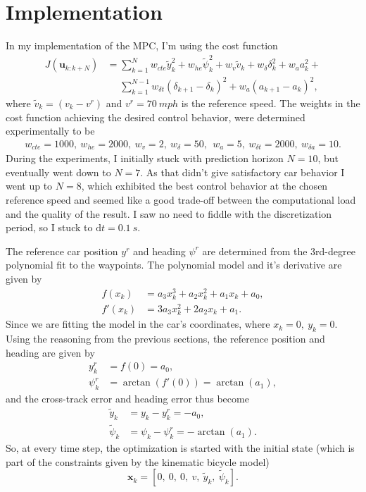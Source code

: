 \documentclass[a4paper]{article}
\begin{document}
\section{Implementation}
In my implementation of the MPC, I'm using the cost function 
\begin{align}\label{eq:mpc_my_cost}
	J(\bm{u}_{k:k+N}) 
	&= \sum_{k=1}^{N} w_{cte}\tilde{y}_k^2 + w_{he}\tilde{\psi}_k^2 + w_{v}\tilde{v}_k + w_{\delta}\delta_k^2  + w_{a}a_k^2 + \nonumber \\
	&\mathrel{\phantom{=}} \sum_{k=1}^{N-1} w_{\delta t}(\delta_{k+1} - \delta_k)^2 + w_a(a_{k+1} - a_k)^2,
\end{align}
where $ \tilde{v}_k = (v_k - v^r) $ and $ v^r = \SI{70}{mph} $ is the reference speed.
The weights in the cost function achieving the desired control behavior, were determined experimentally to be
\begin{align}\label{key}
w_{cte} = 1000,\ w_{he} = 2000,\  w_{v} = 2,\ w_{\delta} = 50,\ \ w_{a} = 5,\ w_{\delta t} = 2000,\ w_{\delta a} = 10.
\end{align}
During the experiments, I initially stuck with prediction horizon $ N = 10 $, but eventually went down to $ N = 7 $.
As that didn't give satisfactory car behavior I went up to $ N = 8 $, which exhibited the best control behavior at the chosen reference speed and seemed like a good trade-off between the computational load and the quality of the result.
I saw no need to fiddle with the discretization period, so I stuck to $ \mathrm{d}t = \SI{0.1}{s} $.

The reference car position $ y^r $ and heading $ \psi^r $ are determined from the 3rd-degree polynomial fit to the waypoints.
The polynomial model and it's derivative are given by
\begin{align}\label{eq:trajectory_polynomial}
	f(x_k) 	&= a_3x_k^3 + a_2x_k^2 + a_1x_k + a_0, \\
	f'(x_k) &= 3a_3x_k^2 + 2a_2x_k + a_1.
\end{align}
Since we are fitting the model in the car's coordinates, where $ x_k = 0,\ y_k = 0 $.
Using the reasoning from the previous sections, the reference position and heading are given by
\begin{align}\label{}
y^r_k 		&= f(0) = a_0, \\
\psi^r_k	&= \arctan(f'(0)) = \arctan(a_1),
\end{align}
and the cross-track error and heading error thus become
\begin{align}\label{}
	\tilde{y}_k 	&= y_k - y^r_k = -a_0,	\\
	\tilde{\psi}_k 	&= \psi_k - \psi^r_k = -\arctan(a_1).
\end{align}
So, at every time step, the optimization is started with the initial state (which is part of the constraints given by the kinematic bicycle model)
\begin{equation}\label{}
	\bm{x}_k = \left[ 0,\ 0,\ 0,\ v,\ \tilde{y}_k,\ \tilde{\psi}_k \right].
\end{equation}





\end{document}
